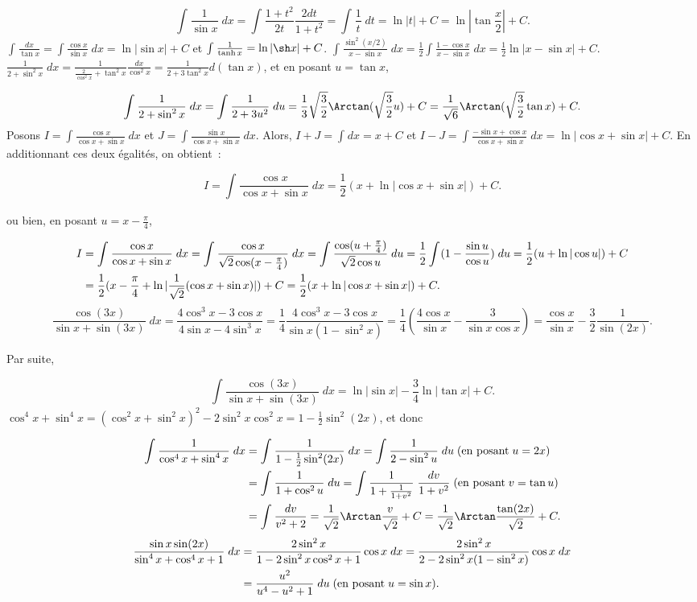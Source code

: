 {{$$\int_{}^{}\frac{1}{\sin x}\;dx=\int_{}^{}\frac{1+t^2}{2t}\frac{2dt}{1+t^2}=\int_{}^{}\frac{1}{t}\;dt=\ln|t|+C=\ln|\tan\frac{x}{2}|+C.$$
$\int_{}^{}\frac{dx}{\tan x}=\int_{}^{}\frac{\cos x}{\sin x}\;dx=\ln|\sin x|+C$ et $\int_{}^{}\frac{1}{\tanh x}=\ln|\sh x|+C$.
$\int_{}^{}\frac{\sin^2(x/2)}{x-\sin x}\;dx=\frac{1}{2}\int_{}^{}\frac{1-\cos x}{x-\sin x}\;dx=\frac{1}{2}\ln|x-\sin x|+C$.
$\frac{1}{2+\sin^2x}\;dx=\frac{1}{\frac{2}{\cos^2x}+\tan^2x}\frac{dx}{\cos^2x}=\frac{1}{2+3\tan^2x}d(\tan x)$, et en posant $u=\tan x$,

$$\int_{}^{}\frac{1}{2+\sin^2x}\;dx=\int_{}^{}\frac{1}{2+3u^2}\;du=\frac{1}{3}\sqrt{\frac{3}{2}}\Arctan(\sqrt{\frac{3}{2}}u)+C=\frac{1}{\sqrt{6}}\Arctan(\sqrt{\frac{3}{2}}\tan x)+C.$$
Posons $I=\int_{}^{}\frac{\cos x}{\cos x+\sin x}\;dx$ et $J=\int_{}^{}\frac{\sin x}{\cos x+\sin x}\;dx$. Alors, $I+J=\int_{}^{}dx=x+C$ et $I-J=\int_{}^{}\frac{-\sin x+\cos x}{\cos x+\sin x}\;dx=\ln|\cos x+\sin x|+C$. En additionnant ces deux égalités, on obtient~:

$$I=\int_{}^{}\frac{\cos x}{\cos x+\sin x}\;dx=\frac{1}{2}(x+\ln|\cos x+\sin x|)+C.$$

ou bien, en posant $u=x-\frac{\pi}{4}$,

\begin{align*}\ensuremath
I&=\int_{}^{}\frac{\cos x}{\cos x+\sin x}\;dx=\int_{}^{}\frac{\cos x}{\sqrt{2}\cos(x-\frac{\pi}{4})}\;dx
=\int_{}^{}\frac{\cos(u+\frac{\pi}{4})}{\sqrt{2}\cos u}\;du=\frac{1}{2}\int_{}^{}(1-\frac{\sin u}{\cos u})\;du
=\frac{1}{2}(u+\ln|\cos u|)+C\\
 &=\frac{1}{2}(x-\frac{\pi}{4}+\ln|\frac{1}{\sqrt{2}}(\cos x+\sin x)|)+C=\frac{1}{2}(x+\ln|\cos x+\sin x|)+C.
\end{align*}
$$\frac{\cos(3x)}{\sin x+\sin(3x)}\;dx=\frac{4\cos^3x-3\cos x}{4\sin x-4\sin^3x}=\frac{1}{4}\frac{4\cos^3x-3\cos x}{\sin x(1-\sin^2x)}=\frac{1}{4}(\frac{4\cos x}{\sin x}-\frac{3}{\sin x\cos x})=\frac{\cos x}{\sin x}-\frac{3}{2}\frac{1}{\sin(2x)}.
$$

Par suite,

$$\int_{}^{}\frac{\cos(3x)}{\sin x+\sin(3x)}\;dx=\ln|\sin x|-\frac{3}{4}\ln|\tan x|+C.$$
$\cos^4x+\sin^4x=(\cos^2x+\sin^2x)^2-2\sin^2x\cos^2x=1-\frac{1}{2}\sin^2(2x)$, et donc

\begin{align*}\ensuremath
\int_{}^{}\frac{1}{\cos^4x+\sin^4x}\;dx&=\int_{}^{}\frac{1}{1-\frac{1}{2}\sin^2(2x)}\;dx
=\int_{}^{}\frac{1}{2-\sin^2u}\;du\;(\mbox{en posant}\;u=2x)\\
 &=\int_{}^{}\frac{1}{1+\cos^2u}\;du=\int_{}^{}\frac{1}{1+\frac{1}{1+v^2}}\;\frac{dv}{1+v^2}\;(\mbox{en posant}\;v=\tan u)\\
 &=\int_{}^{}\frac{dv}{v^2+2}=\frac{1}{\sqrt{2}}\Arctan\frac{v}{\sqrt{2}}+C
=\frac{1}{\sqrt{2}}\Arctan\frac{\tan(2x)}{\sqrt{2}}+C.
\end{align*}
\begin{align*}\ensuremath
\frac{\sin x\sin(2x)}{\sin^4x+\cos^4x+1}\;dx&=\frac{2\sin^2x}{1-2\sin^2x\cos^2x+1}\cos x\;dx=\frac{2\sin^2x}{2-2\sin^2x(1-\sin^2x)}\cos x\;dx\\
 &=\frac{u^2}{u^4-u^2+1}\;du\;(\mbox{en posant}\;u=\sin x).
\end{align*}

}}
